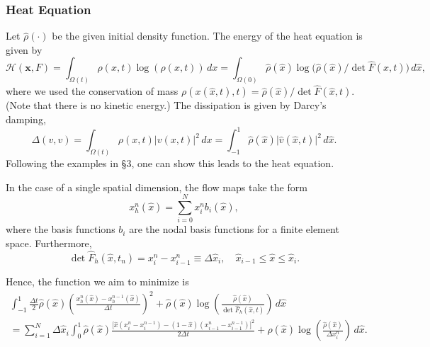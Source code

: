 \documentclass[final,10pt]{article}
\begin{document}
\subsubsection{Heat Equation}

Let $\hat{\rho}(\cdot)$ be the given initial density function.
The energy of the heat equation is given by
\[
	\mathcal H (\bm x,   F) = \int_{\Omega(t)} \rho(  x,t) \log\left({\rho(  x,t)}\right)\, d  x
	=	\int_{\Omega(0)} \hat{\rho}(\hat{  x}) \log \big(\hat{\rho}(\hat{  x})/ \det\hat{  F}(\hat{  x},t)\big) \, d\hat{  x},
\]
where we used the conservation of mass $\rho(  x(\hat{  x},t),t) =  \hat{\rho}(\hat{  x})/\det\hat{  F}(\hat{  x},t)$.
(Note that there is no kinetic energy.)
The dissipation is given by Darcy's damping,
\[
	\Delta (  v,   v)	=	\int_{\Omega(t)} \rho(  x,t) \big|  v(  x,t) \big|^2\, d  x	
					=	\int_{-1}^1 \hat{\rho}(\hat{  x}) \big|\hat{  v}(\hat{  x},t) \big|^2\, d\hat{  x}.
\]
Following the examples in \S 3, one can show this leads to the heat equation.

In the case of a single spatial dimension, the flow maps take the form
\[
	  x_h^n(\hat{  x}) = \sum_{i=0}^N x_i^n b_i(\hat{  x}),
\]
where the basis functions $b_i$ are the nodal basis functions for a finite element space.
Furthermore, 
\[
	\det\hat{F}_h(\hat{ x},t_n) = {x}_i^n - {x}^n_{i-1} \equiv \Delta \hat{x}_i,	\quad	\hat{ x}_{i-1} \le \hat{ x} \le \hat{ x}_i.
\]

Hence, the function we aim to minimize is
\begin{multline*}
	\int_{-1}^1 \frac{\Delta t}{2}\hat{\rho}(\hat{  x}) \left(\frac{x_h^n(\hat{  x}) - x_h^{n-1}(\hat{  x})}{\Delta t}\right)^2
							+ \hat{\rho}(\hat{  x}) \log\left(\frac{\hat{\rho}(\hat{  x})}{\det\hat{F}_h(\hat{  x},t)}\right) \, d\hat{  x}\\
			=	\sum_{i=1}^N \Delta \hat{x}_i \int_0^1 
						\hat{\rho}(\hat{x}) \frac{\big[\hat{x}(x_i^n-x_i^{n-1})-(1-\hat{x})(x_{i-1}^n-x_{i-1}^{n-1})\big]^2}{2\Delta t}
							+ \hat{\rho}(\hat{  x}) \log\left(\frac{\hat{\rho}(\hat{  x})}{\Delta x_i^n}\right) \, d\hat{x}.
\end{multline*}
\end{document}
